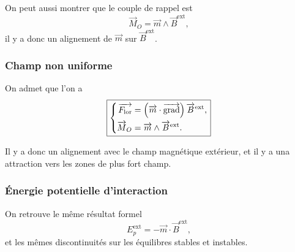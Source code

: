 On peut aussi montrer que le couple de rappel est
\begin{equation*}
    \boxed{
        \vec{M}_O=\vec{m}\wedge\vec{B}^{\mathrm{ext}},
    }
\end{equation*}
il y a donc un alignement de $\vec{m}$ sur $\vec{B}^{\mathrm{ext}}$.

\subsubsection{Champ non uniforme}
On admet que l'on a 
\begin{equation*}
    \boxed{
        \left\lbrace
    \begin{aligned}
        \protect\overrightarrow{{F_{\mathrm{lor}}}}&=\left(\protect\overrightarrow{{m}}\cdot\operatorname{\overrightarrow{\text{grad}}}\right)\protect\overrightarrow{{B}}^{\mathrm{ext}},\\
        \protect\overrightarrow{{M}}_O&=\protect\overrightarrow{{m}}\wedge\protect\overrightarrow{{B}}^{\mathrm{ext}}.
    \end{aligned}
    \right.}
\end{equation*}

Il y a donc un alignement avec le champ magnétique extérieur, et il y a una attraction vers les zones de plus fort champ.

\subsubsection{Énergie potentielle d'interaction}

On retrouve le même résultat formel
\begin{equation*}
    \boxed{
        E_p^{\mathrm{ext}}=-\vec{m}\cdot\vec{B}^{\mathrm{ext}},
    }
\end{equation*}
et les mêmes discontinuités sur les équilibres stables et instables.